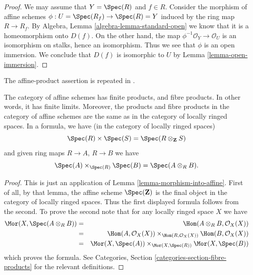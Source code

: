 \begin{proof}
We may assume that $Y = \Spec(R)$ and $f \in R$.
Consider the morphism of affine schemes
$\phi : U = \Spec(R_f) \to \Spec(R) = Y$ induced by the ring
map $R \to R_f$. By Algebra, Lemma \ref{algebra-lemma-standard-open}
we know that it is a homeomorphism onto $D(f)$.
On the other hand, the map $\phi^{-1}\mathcal{O}_Y \to \mathcal{O}_U$
is an isomorphism on stalks, hence an isomorphism. Thus we see
that $\phi$ is an open immersion. We conclude that $D(f)$
is isomorphic to $U$ by Lemma \ref{lemma-open-immersion}.
\end{proof}

\begin{lemma}
\label{lemma-fibre-product-affine-schemes}
\begin{reference}
\cite[Chapter II, \S 1, no. 33, pp. 225--226]{FAC}
The affine-product assertion is repeated in
\cite[Chapter II, \S 3, no. 42, pp. 233--234]{FAC}.
\end{reference}
The category of affine schemes has finite products, and fibre products.
In other words, it has finite limits. Moreover, the products
and fibre products in the category of affine schemes
are the same as in the category of locally ringed spaces.
In a formula, we have (in the category of locally ringed spaces)
$$
\Spec(R) \times \Spec(S) =
\Spec(R \otimes_{\mathbf{Z}} S)
$$
and given ring maps $R \to A$, $R \to B$ we have
$$
\Spec(A) \times_{\Spec(R)} \Spec(B)
=
\Spec(A \otimes_R B).
$$
\end{lemma}

\begin{proof}
This is just an application of Lemma \ref{lemma-morphism-into-affine}.
First of all, by that lemma, the affine scheme
$\Spec(\mathbf{Z})$ is the final object in the category
of locally ringed spaces. Thus the first displayed formula
follows from the second. To prove the second note that
for any locally ringed space $X$ we have
\begin{eqnarray*}
\Mor(X, \Spec(A \otimes_R B))
& = &
\Hom(A \otimes_R B, \mathcal{O}_X(X)) \\
& = &
\Hom(A, \mathcal{O}_X(X))
\times_{\Hom(R, \mathcal{O}_X(X))}
\Hom(B, \mathcal{O}_X(X)) \\
& = &
\Mor(X, \Spec(A))
\times_{\Mor(X, \Spec(R))}
\Mor(X, \Spec(B))
\end{eqnarray*}
which proves the formula.
See Categories, Section \ref{categories-section-fibre-products} for the
relevant definitions.
\end{proof}

